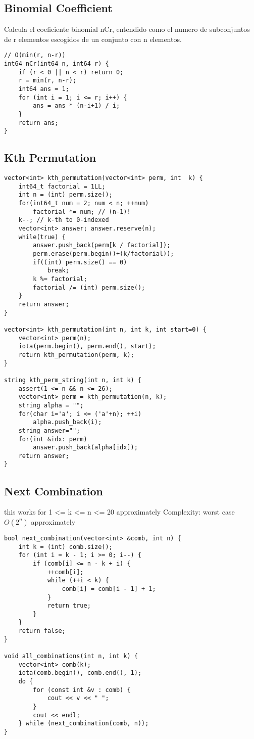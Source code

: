 \documentclass[10pt,letterpaper,twocolumn,twosided]{article}
\begin{document}
\subsection{Binomial Coefficient}
Calcula el coeficiente binomial nCr, entendido como el numero de subconjuntos de r elementos escogidos de un conjunto con n elementos.

\begin{lstlisting}
// O(min(r, n-r))
int64 nCr(int64 n, int64 r) {
    if (r < 0 || n < r) return 0;
    r = min(r, n-r);
    int64 ans = 1;
    for (int i = 1; i <= r; i++) {
        ans = ans * (n-i+1) / i;
    }
    return ans;
}
\end{lstlisting}

\subsection{Kth Permutation}
\begin{lstlisting}
vector<int> kth_permutation(vector<int> perm, int  k) {
    int64_t factorial = 1LL;
    int n = (int) perm.size();
    for(int64_t num = 2; num < n; ++num)
        factorial *= num; // (n-1)!
    k--; // k-th to 0-indexed
    vector<int> answer; answer.reserve(n);
    while(true) {
        answer.push_back(perm[k / factorial]);
        perm.erase(perm.begin()+(k/factorial));
        if((int) perm.size() == 0)
            break;
        k %= factorial;
        factorial /= (int) perm.size();
    }
    return answer;
}

vector<int> kth_permutation(int n, int k, int start=0) {
    vector<int> perm(n);
    iota(perm.begin(), perm.end(), start);
    return kth_permutation(perm, k);
}

string kth_perm_string(int n, int k) {
    assert(1 <= n && n <= 26);
    vector<int> perm = kth_permutation(n, k);
    string alpha = "";
    for(char i='a'; i <= ('a'+n); ++i)
        alpha.push_back(i);
    string answer="";
    for(int &idx: perm)
        answer.push_back(alpha[idx]);
    return answer;
}
\end{lstlisting}

\subsection{Next Combination}
this works for 1 <= k <= n <= 20 approximately
Complexity: worst case $O(2^n)$ approximately
\begin{lstlisting}
bool next_combination(vector<int> &comb, int n) {
    int k = (int) comb.size();
    for (int i = k - 1; i >= 0; i--) {
        if (comb[i] <= n - k + i) {
            ++comb[i];
            while (++i < k) {
                comb[i] = comb[i - 1] + 1;
            }
            return true;
        }
    }
    return false;
}

void all_combinations(int n, int k) {
    vector<int> comb(k);
    iota(comb.begin(), comb.end(), 1);
    do {
        for (const int &v : comb) {
            cout << v << " ";
        }
        cout << endl;
    } while (next_combination(comb, n));
}
\end{lstlisting}
\end{document}
